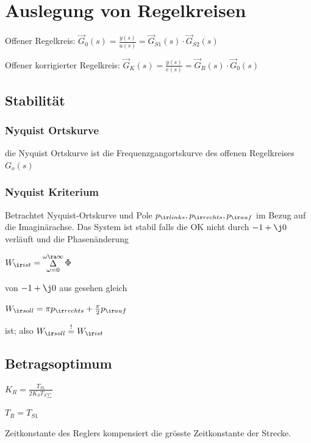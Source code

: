 \documentclass[fs, german]{latex4ei_fs}
\begin{document}
\section{Auslegung von Regelkreisen}
\begin{sectionbox}
Offener Regelkreis: $\vec G_0 (s) = \frac{y(s)}{u(s)} = \vec G_{S1} (s) \cdot \vec G_{S2} (s)$

Offener korrigierter Regelkreis: $\vec G_K (s) = \frac{y(s)}{e(s)} = \vec G_R (s) \cdot \vec G_0 (s)$

\subsection{Stabilität}

\subsubsection{Nyquist Ortskurve}
	
	die Nyquist Ortskurve ist die Frequenzgangortskurve des offenen Regelkreises $G_o (s)$ 
	
	\subsubsection{Nyquist Kriterium}
	
	Betrachtet Nyquist-Ortskurve und Pole $p_{\ir links}, p_{\ir rechts}, p_{\ir auf}$ im Bezug auf die Imaginärachse.
	Das System ist stabil falls die OK nicht durch $-1 + \j 0$ verläuft und die Phasenänderung \\
	
	\begin{emphbox}
	$W_{\ir ist} = \mathop{\Delta}\limits_{\omega = 0}^{\omega \ra \infty} \Phi$
	\end{emphbox}
	
	von $-1 + \j 0$ aus gesehen gleich \\
	
		\begin{emphbox}
		$W_{\ir soll} = \pi p_{\ir rechts} + \frac{\pi}{2} p_{\ir auf}$
		\end{emphbox}
	ist; also $W_{\ir soll} \stackrel{!}{=} W_{\ir ist}$ 
\end{sectionbox}
\begin{sectionbox}
\subsection{Betragsoptimum}
$K_R = \frac{T_{S1}}{2 K_S T_{S \sum}}$

$T_R = T_{S1}$

Zeitkonstante des Reglers kompensiert die grösste Zeitkonstante der Strecke.

\end{sectionbox}
\end{document}
